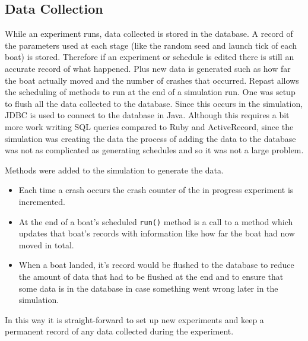   \subsection{Data Collection}
  While an experiment runs, data collected is stored in the database. A record of the parameters used at each stage (like the random seed and launch tick of each boat) is stored. Therefore if an experiment or schedule is edited there is still an accurate record of what happened. Plus new data is generated such as how far the boat actually moved and the number of crashes that occurred. Repast allows the scheduling of methods to run at the end of a simulation run. One was setup to flush all the data collected to the database. Since this occurs in the simulation, JDBC is used to connect to the database in Java. Although this requires a bit more work writing SQL queries compared to Ruby and ActiveRecord, since the simulation was creating the data the process of adding the data to the database was not as complicated as generating schedules and so it was not a large problem.
  
  Methods were added to the simulation to generate the data.
  \begin{itemize}
    \item Each time a crash occurs the crash counter of the in progress experiment is incremented.
    \item At the end of a boat's scheduled \texttt{run()} method is a call to a method which updates that boat's records with information like how far the boat had now moved in total.
    \item When a boat landed, it's record would be flushed to the database to reduce the amount of data that had to be flushed at the end and to ensure that some data is in the database in case something went wrong later in the simulation.
  \end{itemize}
  
  In this way it is straight-forward to set up new experiments and keep a permanent record of any data collected during the experiment.

